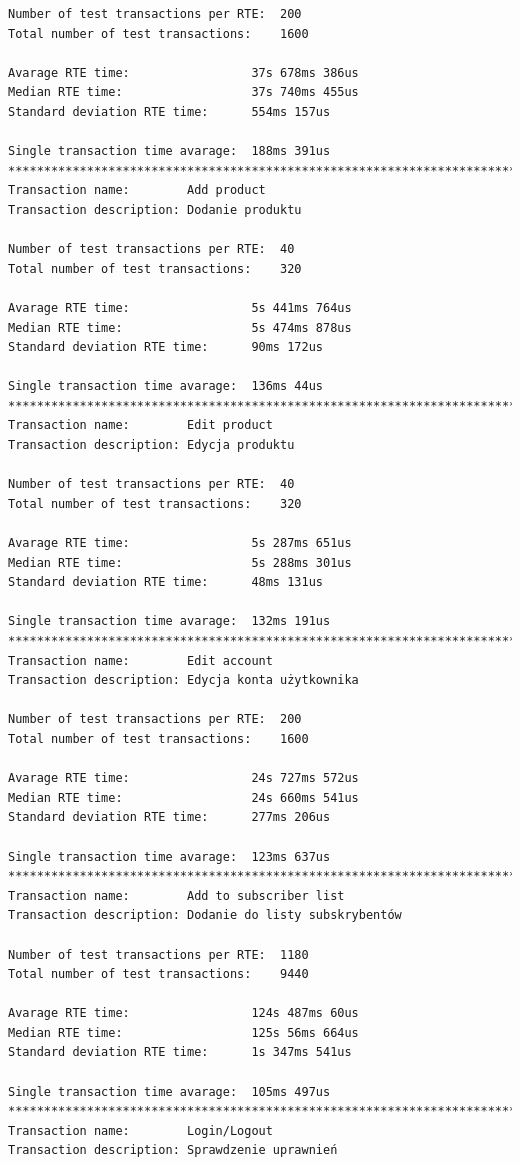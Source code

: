 \begin{Verbatim}
Number of test transactions per RTE:  200
Total number of test transactions:    1600

Avarage RTE time:                 37s 678ms 386us
Median RTE time:                  37s 740ms 455us
Standard deviation RTE time:      554ms 157us

Single transaction time avarage:  188ms 391us
*********************************************************************************
Transaction name:        Add product
Transaction description: Dodanie produktu

Number of test transactions per RTE:  40
Total number of test transactions:    320

Avarage RTE time:                 5s 441ms 764us
Median RTE time:                  5s 474ms 878us
Standard deviation RTE time:      90ms 172us

Single transaction time avarage:  136ms 44us
*********************************************************************************
Transaction name:        Edit product
Transaction description: Edycja produktu

Number of test transactions per RTE:  40
Total number of test transactions:    320

Avarage RTE time:                 5s 287ms 651us
Median RTE time:                  5s 288ms 301us
Standard deviation RTE time:      48ms 131us

Single transaction time avarage:  132ms 191us
*********************************************************************************
Transaction name:        Edit account
Transaction description: Edycja konta użytkownika

Number of test transactions per RTE:  200
Total number of test transactions:    1600

Avarage RTE time:                 24s 727ms 572us
Median RTE time:                  24s 660ms 541us
Standard deviation RTE time:      277ms 206us

Single transaction time avarage:  123ms 637us
*********************************************************************************
Transaction name:        Add to subscriber list
Transaction description: Dodanie do listy subskrybentów

Number of test transactions per RTE:  1180
Total number of test transactions:    9440

Avarage RTE time:                 124s 487ms 60us
Median RTE time:                  125s 56ms 664us
Standard deviation RTE time:      1s 347ms 541us

Single transaction time avarage:  105ms 497us
*********************************************************************************
Transaction name:        Login/Logout
Transaction description: Sprawdzenie uprawnień


\end{Verbatim}
